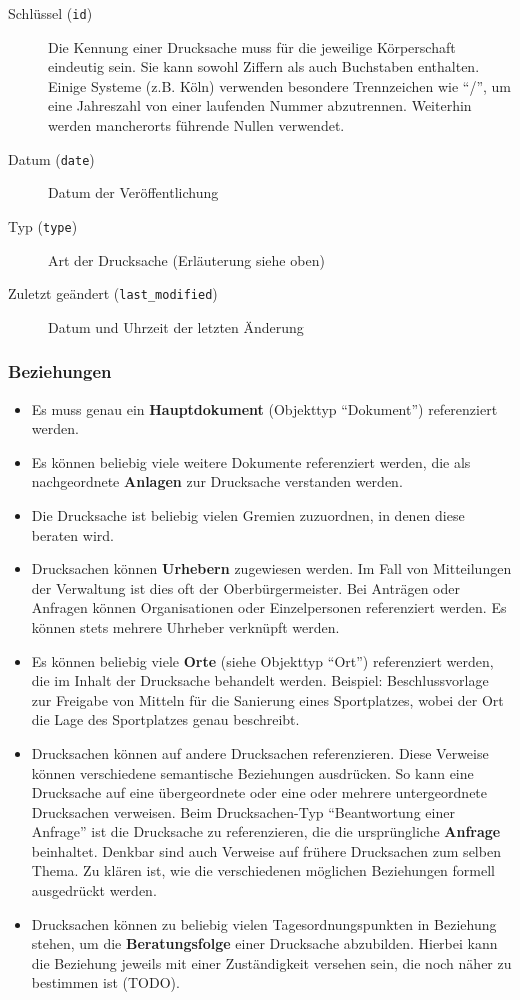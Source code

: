 \documentclass[,a4paper]{article}
\begin{document}
\begin{description}
\item[Schlüssel (\texttt{id})]
Die Kennung einer Drucksache muss für die jeweilige Körperschaft
eindeutig sein. Sie kann sowohl Ziffern als auch Buchstaben enthalten.
Einige Systeme (z.B. Köln) verwenden besondere Trennzeichen wie ``/'',
um eine Jahreszahl von einer laufenden Nummer abzutrennen. Weiterhin
werden mancherorts führende Nullen verwendet.
\item[Datum (\texttt{date})]
Datum der Veröffentlichung
\item[Typ (\texttt{type})]
Art der Drucksache (Erläuterung siehe oben)
\item[Zuletzt geändert (\texttt{last\_modified})]
Datum und Uhrzeit der letzten Änderung
\end{description}

\subsubsection{Beziehungen}

\begin{itemize}
\item
  Es muss genau ein \textbf{Hauptdokument} (Objekttyp ``Dokument'')
  referenziert werden.
\item
  Es können beliebig viele weitere Dokumente referenziert werden, die
  als nachgeordnete \textbf{Anlagen} zur Drucksache verstanden werden.
\item
  Die Drucksache ist beliebig vielen Gremien zuzuordnen, in denen diese
  beraten wird.
\item
  Drucksachen können \textbf{Urhebern} zugewiesen werden. Im Fall von
  Mitteilungen der Verwaltung ist dies oft der Oberbürgermeister. Bei
  Anträgen oder Anfragen können Organisationen oder Einzelpersonen
  referenziert werden. Es können stets mehrere Uhrheber verknüpft
  werden.
\item
  Es können beliebig viele \textbf{Orte} (siehe Objekttyp ``Ort'')
  referenziert werden, die im Inhalt der Drucksache behandelt werden.
  Beispiel: Beschlussvorlage zur Freigabe von Mitteln für die Sanierung
  eines Sportplatzes, wobei der Ort die Lage des Sportplatzes genau
  beschreibt.
\item
  Drucksachen können auf andere Drucksachen referenzieren. Diese
  Verweise können verschiedene semantische Beziehungen ausdrücken. So
  kann eine Drucksache auf eine übergeordnete oder eine oder mehrere
  untergeordnete Drucksachen verweisen. Beim Drucksachen-Typ
  ``Beantwortung einer Anfrage'' ist die Drucksache zu referenzieren,
  die die ursprüngliche \textbf{Anfrage} beinhaltet. Denkbar sind auch
  Verweise auf frühere Drucksachen zum selben Thema. Zu klären ist, wie
  die verschiedenen möglichen Beziehungen formell ausgedrückt werden.
\item
  Drucksachen können zu beliebig vielen Tagesordnungspunkten in
  Beziehung stehen, um die \textbf{Beratungsfolge} einer Drucksache
  abzubilden. Hierbei kann die Beziehung jeweils mit einer Zuständigkeit
  versehen sein, die noch näher zu bestimmen ist (TODO).
\end{itemize}
\end{document}
